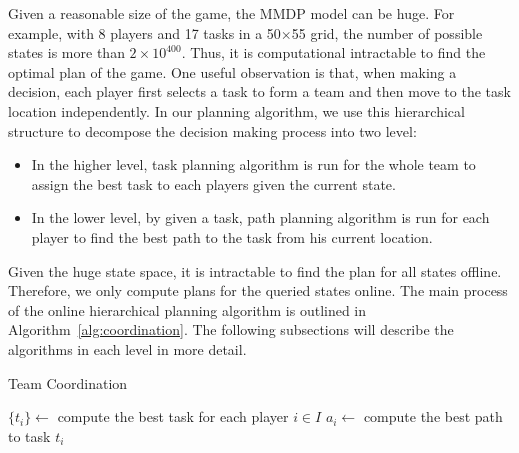 Given a reasonable size of the game, the MMDP model can be huge.
For example, with 8 players and 17 tasks in a 50$\times$55 grid,
the number of possible states is more than $2\times 10^{400}$.
Thus, it is computational intractable to find the optimal plan of
the game. One useful observation is that, when making a decision,
each player first selects a task to form a team and then move to
the task location independently. In our planning algorithm, we use
this hierarchical structure to decompose the decision making
process into two level:
\begin{itemize}
  \item In the higher level, task planning algorithm is run for
      the whole team to assign the best task to each players
      given the current state.
  \item In the lower level, by given a task, path planning
      algorithm is run for each player to find the best path to
      the task from his current location.
\end{itemize}
Given the huge state space, it is intractable to find the plan for
all states offline. Therefore, we only compute plans for the
queried states online. The main process of the online hierarchical
planning algorithm is outlined in Algorithm~\ref{alg:coordination}.
The following subsections will describe the algorithms in each
level in more detail.

\begin{algorithm}[t]
  \caption{Team Coordination}
  $\{ t_i \} \gets$ compute the best task for each player $i\in I$ \;
   {
    $a_i \gets$ compute the best path to task $t_i$ \;
  }
  \label{alg:coordination}
\end{algorithm}

